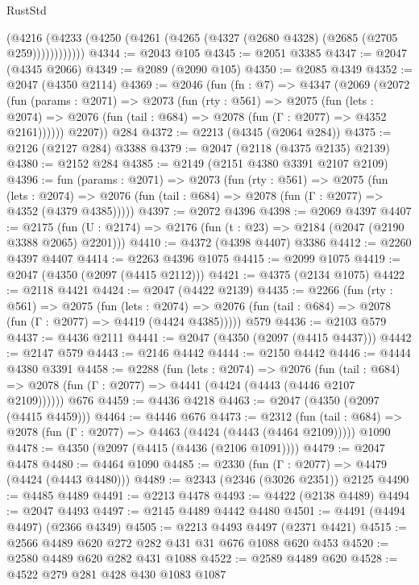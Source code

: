 \begin{lexlean}{RustStd}
\begin{coremodule}
            (@4216 (@4233 (@4250 (@4261 (@4265 (@4327 (@2680 @4328) (@2685 (@2705 @259))))))))))))
@4344 := @2043 @105
@4345 := @2051 @3385
@4347 := @2047 (@4345 @2066)
@4349 := @2089 (@2090 @105)
@4350 := @2085 @4349
@4352 := @2047 (@4350 @2114)
@4369 := @2046
    (fun (fn : @7) =>
    @4347
      (@2069
        (@2072
          (fun (params : @2071) =>
          @2073
            (fun (rty : @561) =>
            @2075
              (fun (lets : @2074) =>
              @2076 (fun (tail : @684) => @2078 (fun (Γ : @2077) => @4352 @2161))))))
        @2207))
    @284
@4372 := @2213 (@4345 (@2064 @284))
@4375 := @2126 (@2127 @284) @3388
@4379 := @2047 (@2118 (@4375 @2135) @2139)
@4380 := @2152 @284
@4385 := @2149 (@2151 @4380 @3391 @2107 @2109)
@4396 := fun (params : @2071) =>
  @2073
    (fun (rty : @561) =>
    @2075
      (fun (lets : @2074) =>
      @2076 (fun (tail : @684) => @2078 (fun (Γ : @2077) => @4352 (@4379 @4385)))))
@4397 := @2072 @4396
@4398 := @2069 @4397
@4407 := @2175 (fun (U : @2174) => @2176 (fun (t : @23) => @2184 (@2047 (@2190 @3388 @2065) @2201)))
@4410 := @4372 (@4398 @4407) @3386
@4412 := @2260 @4397 @4407
@4414 := @2263 @4396 @1075
@4415 := @2099 @1075
@4419 := @2047 (@4350 (@2097 (@4415 @2112)))
@4421 := @4375 (@2134 @1075)
@4422 := @2118 @4421
@4424 := @2047 (@4422 @2139)
@4435 := @2266
    (fun (rty : @561) =>
    @2075
      (fun (lets : @2074) =>
      @2076 (fun (tail : @684) => @2078 (fun (Γ : @2077) => @4419 (@4424 @4385)))))
    @579
@4436 := @2103 @579
@4437 := @4436 @2111
@4441 := @2047 (@4350 (@2097 (@4415 @4437)))
@4442 := @2147 @579
@4443 := @2146 @4442
@4444 := @2150 @4442
@4446 := @4444 @4380 @3391
@4458 := @2288
    (fun (lets : @2074) =>
    @2076
      (fun (tail : @684) => @2078 (fun (Γ : @2077) => @4441 (@4424 (@4443 (@4446 @2107 @2109))))))
    @676
@4459 := @4436 @4218
@4463 := @2047 (@4350 (@2097 (@4415 @4459)))
@4464 := @4446 @676
@4473 := @2312
    (fun (tail : @684) => @2078 (fun (Γ : @2077) => @4463 (@4424 (@4443 (@4464 @2109)))))
    @1090
@4478 := @4350 (@2097 (@4415 (@4436 (@2106 @1091))))
@4479 := @2047 @4478
@4480 := @4464 @1090
@4485 := @2330 (fun (Γ : @2077) => @4479 (@4424 (@4443 @4480)))
@4489 := @2343 (@2346 (@3026 @2351)) @2125
@4490 := @4485 @4489
@4491 := @2213 @4478
@4493 := @4422 (@2138 @4489)
@4494 := @2047 @4493
@4497 := @2145 @4489 @4442 @4480
@4501 := @4491 (@4494 @4497) (@2366 @4349)
@4505 := @2213 @4493 @4497 (@2371 @4421)
@4515 := @2566 @4489 @620 @272 @282 @431 @31 @676 @1088 @620 @453
@4520 := @2580 @4489 @620 @282 @431 @1088
@4522 := @2589 @4489 @620
@4528 := @4522 @279 @281 @428 @430 @1083 @1087

\end{coremodule}
\end{lexlean}

